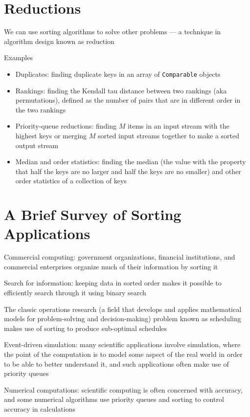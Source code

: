 \documentclass[8pt,a4paper,compress]{beamer}
\begin{document}
\section{Reductions}
\begin{frame}[fragile]
\pause

We can use sorting algorithms to solve other problems --- a technique in algorithm design known as reduction 

\pause
\bigskip

Examples
\begin{itemize}
\item Duplicates: finding duplicate keys in an array of \lstinline$Comparable$ objects
\item Rankings: finding the Kendall tau distance between two rankings (aka permutations), defined as the number of pairs that are in different order in the two rankings
\item Priority-queue reductions: finding $M$ items in an input stream with the highest keys or merging $M$ sorted input streams together to make a sorted output stream
\item Median and order statistics: finding the median (the value with the property that half the keys are no larger and half the keys are no smaller) and other order statistics of a collection of keys
\end{itemize}
\end{frame}

\section{A Brief Survey of Sorting Applications}
\begin{frame}[fragile]
\pause

Commercial computing: government organizations, financial institutions, and commercial enterprises organize much of their information by sorting it

\pause
\bigskip

Search for information: keeping data in sorted order makes it possible to efficiently search through it using binary search

\pause
\bigskip

The classic operations research (a field that develops and applies mathematical models for problem-solving and decision-making) problem known as scheduling makes use of sorting to produce sub-optimal schedules

\pause
\bigskip

Event-driven simulation: many scientific applications involve simulation, where the point of the computation is to model some aspect of the real world in order to be able to better understand it, and such applications often make use of priority queues

\pause
\bigskip

Numerical computations: scientific computing is often concerned with accuracy, and some numerical algorithms use priority queues and sorting to control accuracy in calculations
\end{frame}
\end{document}
